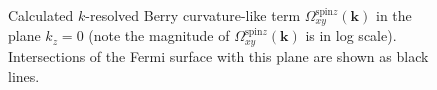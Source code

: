 \begin{figure}[htb!]
	\centering
	\qquad
	\caption{Calculated $k$-resolved Berry curvature-like term 
		$\Omega_{xy}^{\text{spin}z}(\bm k)$ in the plane $k_z=0$ 
		(note the magnitude of $\Omega_{xy}^{\text{spin}z}(\bm k)$ is in log scale). 
		Intersections of the Fermi surface
		with this plane are shown as black lines.}
	\label{fig29.2}
\end{figure}


